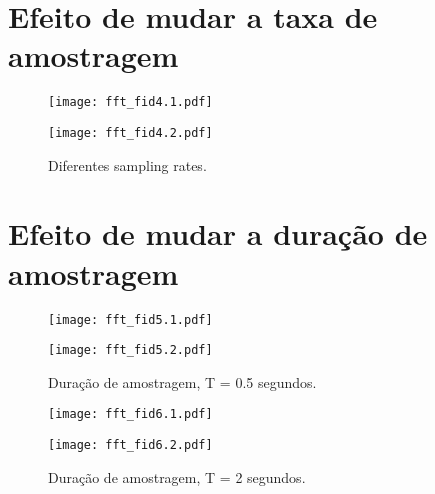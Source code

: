 \newpage

\section{Efeito de mudar a taxa de amostragem}



\begin{figure}[!ht]
    \centering
    \begin{minipage}[b]{0.49\textwidth}
        \centering
        \texttt{[image: fft\_fid4.1.pdf]}
    \end{minipage}
    \hfill
    \begin{minipage}[b]{0.49\textwidth}
        \centering
        \texttt{[image: fft\_fid4.2.pdf]}
    \end{minipage}
    \caption{Diferentes sampling rates.}
\end{figure}

\section{Efeito de mudar a duração de amostragem}



\begin{figure}[!ht]
    \centering
    \begin{minipage}[b]{0.48\textwidth}
        \centering
        \texttt{[image: fft\_fid5.1.pdf]}
    \end{minipage}
    \hfill
    \begin{minipage}[b]{0.48\textwidth}
        \centering
        \texttt{[image: fft\_fid5.2.pdf]}
    \end{minipage}
    \caption{Duração de amostragem, T = 0.5 segundos.}
\end{figure}

\begin{figure}[!ht]
    \centering
    \begin{minipage}[b]{0.48\textwidth}
        \centering
        \texttt{[image: fft\_fid6.1.pdf]}
    \end{minipage}
    \hfill
    \begin{minipage}[b]{0.48\textwidth}
        \centering
        \texttt{[image: fft\_fid6.2.pdf]}
    \end{minipage}
    \caption{Duração de amostragem, T = 2 segundos.}
\end{figure}

